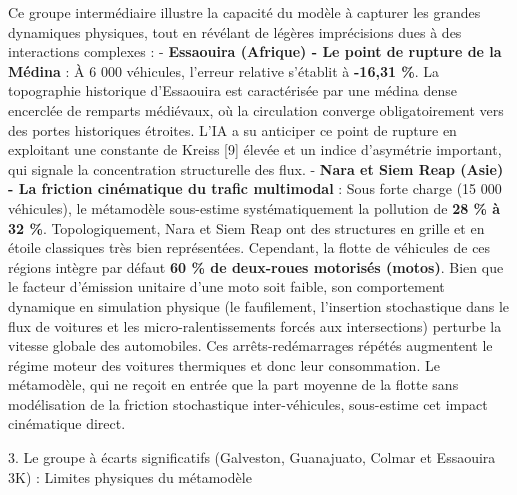 \documentclass[10pt, a4paper]{article}
\begin{document}
Ce groupe intermédiaire illustre la capacité du modèle à capturer les
grandes dynamiques physiques, tout en révélant de légères imprécisions
dues à des interactions complexes : - \textbf{Essaouira (Afrique) - Le
point de rupture de la Médina} : À 6 000 véhicules, l'erreur relative
s'établit à \textbf{-16,31 \%}. La topographie historique d'Essaouira
est caractérisée par une médina dense encerclée de remparts médiévaux,
où la circulation converge obligatoirement vers des portes historiques
étroites. L'IA a su anticiper ce point de rupture en exploitant une
constante de Kreiss {[}9{]} élevée et un indice d'asymétrie important,
qui signale la concentration structurelle des flux. - \textbf{Nara et
Siem Reap (Asie) - La friction cinématique du trafic multimodal} : Sous
forte charge (15 000 véhicules), le métamodèle sous-estime
systématiquement la pollution de \textbf{28 \% à 32 \%}.
Topologiquement, Nara et Siem Reap ont des structures en grille et en
étoile classiques très bien représentées. Cependant, la flotte de
véhicules de ces régions intègre par défaut \textbf{60 \% de deux-roues
motorisés (motos)}. Bien que le facteur d'émission unitaire d'une moto
soit faible, son comportement dynamique en simulation physique (le
faufilement, l'insertion stochastique dans le flux de voitures et les
micro-ralentissements forcés aux intersections) perturbe la vitesse
globale des automobiles. Ces arrêts-redémarrages répétés augmentent le
régime moteur des voitures thermiques et donc leur consommation. Le
métamodèle, qui ne reçoit en entrée que la part moyenne de la flotte
sans modélisation de la friction stochastique inter-véhicules,
sous-estime cet impact cinématique direct.

3. Le groupe à écarts significatifs (Galveston, Guanajuato, Colmar et
Essaouira 3K) : Limites physiques du métamodèle
\end{document}
